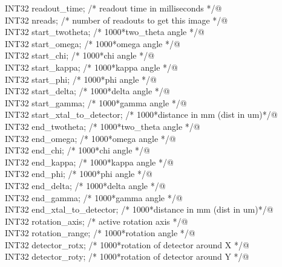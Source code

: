 \documentclass[10pt,a4paper,twoside,notitlepage]{article}
\begin{document}
\begin{flushleft}
\begin{minipage}{\linewidth}
\begin{list}{}{}
\mbox{}\verb@         INT32 readout_time;      /* readout time in milliseconds */@\\
\mbox{}\verb@         INT32 nreads;            /* number of readouts to get this  image */@\\
\mbox{}\verb@         INT32 start_twotheta;    /* 1000*two_theta angle */@\\
\mbox{}\verb@         INT32 start_omega;       /* 1000*omega angle */@\\
\mbox{}\verb@         INT32 start_chi;         /* 1000*chi angle */@\\
\mbox{}\verb@         INT32 start_kappa;       /* 1000*kappa angle */@\\
\mbox{}\verb@         INT32 start_phi;         /* 1000*phi angle */@\\
\mbox{}\verb@         INT32 start_delta;       /* 1000*delta angle */@\\
\mbox{}\verb@         INT32 start_gamma;       /* 1000*gamma angle */@\\
\mbox{}\verb@         INT32 start_xtal_to_detector; /* 1000*distance in mm (dist in um)*/@\\
\mbox{}\verb@         INT32 end_twotheta;           /* 1000*two_theta angle */@\\
\mbox{}\verb@         INT32 end_omega;              /* 1000*omega angle */@\\
\mbox{}\verb@         INT32 end_chi;                /* 1000*chi angle */@\\
\mbox{}\verb@         INT32 end_kappa;              /* 1000*kappa angle */@\\
\mbox{}\verb@         INT32 end_phi;                /* 1000*phi angle */@\\
\mbox{}\verb@         INT32 end_delta;              /* 1000*delta angle */@\\
\mbox{}\verb@         INT32 end_gamma;              /* 1000*gamma angle */@\\
\mbox{}\verb@         INT32 end_xtal_to_detector;   /* 1000*distance in mm (dist in um)*/@\\
\mbox{}\verb@         INT32 rotation_axis;          /* active rotation axis */@\\
\mbox{}\verb@         INT32 rotation_range;         /* 1000*rotation angle */@\\
\mbox{}\verb@         INT32 detector_rotx;          /* 1000*rotation of detector  around X */@\\
\mbox{}\verb@         INT32 detector_roty;          /* 1000*rotation of detector  around Y */@\\

\end{list}
\end{minipage}
\end{flushleft}
\end{document}
